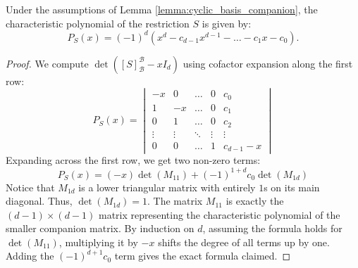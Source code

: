 \begin{lemma}\label{lemma:companion_char_poly}
  Under the assumptions of Lemma \ref{lemma:cyclic_basis_companion}, the characteristic polynomial of the restriction $S$ is given by:
  \[
  P_S(x) = (-1)^d (x^d - c_{d-1}x^{d-1} - \dots - c_1 x - c_0).
  \]
\end{lemma}

\begin{proof}
  We compute $\det([S]_{\mathcal{B}}^{\mathcal{B}} - x I_d)$ using cofactor expansion along the first row:
  \[
  P_S(x) = \begin{vmatrix}
    -x & 0 & \dots & 0 & c_0 \\
    1 & -x & \dots & 0 & c_1 \\
    0 & 1 & \dots & 0 & c_2 \\
    \vdots & \vdots & \ddots & \vdots & \vdots \\
    0 & 0 & \dots & 1 & c_{d-1} - x
  \end{vmatrix}
  \]
  Expanding across the first row, we get two non-zero terms:
  \[
  P_S(x) = (-x) \det(M_{11}) + (-1)^{1+d} c_0 \det(M_{1d})
  \]
  Notice that $M_{1d}$ is a lower triangular matrix with entirely $1$s on its main diagonal. Thus, $\det(M_{1d}) = 1$. The matrix $M_{11}$ is exactly the $(d-1) \times (d-1)$ matrix representing the characteristic polynomial of the smaller companion matrix. By induction on $d$, assuming the formula holds for $\det(M_{11})$, multiplying it by $-x$ shifts the degree of all terms up by one. Adding the $(-1)^{d+1}c_0$ term gives the exact formula claimed.
\end{proof}

